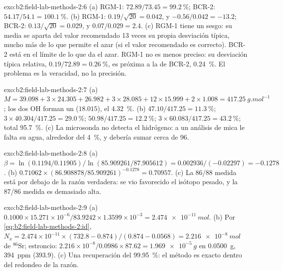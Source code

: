 \begin{solution}{exo:b2:field-lab-methods-2:6}
(a) RGM-1: $72.89/73.45 = \qty{99.2}{\percent}$; BCR-2: $54.17/54.1 = \qty{100.1}{\percent}$.
(b) RGM-1: $0.19/\sqrt{20} = 0.042$, y $-0.56/0.042 = -13.2$; BCR-2: $0.13/\sqrt{20} = 0.029$, y
$0.07/0.029 = 2.4$. (c) RGM-1 tiene un sesgo: su media se aparta del valor recomendado 13 veces su propia
desviación típica, mucho más de lo que permite el azar (si el valor recomendado es correcto). BCR-2 está en
el límite de lo que da el azar. RGM-1 no es menos preciso: su desviación típica relativa,
$0.19/72.89 = \qty{0.26}{\percent}$, es próxima a la de BCR-2, \qty{0.24}{\percent}. El problema es
la veracidad, no la precisión.
\end{solution}

\begin{solution}{exo:b2:field-lab-methods-2:7}
(a) $M = 39.098 + 3 \times 24.305 + 26.982 + 3 \times 28.085 + 12 \times 15.999 + 2 \times 1.008 =
\qty{417.25}{g.mol^{-1}}$; los dos OH forman un  ($18.015$), el \qty{4.32}{\percent}.
(b)  $47.10/417.25 = \qty{11.3}{\percent}$;  $3 \times 40.304/417.25 =
\qty{29.0}{\percent}$;  $50.98/417.25 = \qty{12.2}{\percent}$;  $3 \times
60.083/417.25 = \qty{43.2}{\percent}$; total \qty{95.7}{\percent}. (c) La microsonda no
detecta el hidrógeno: a un análisis de mica le falta su agua, alrededor del \qty{4}{\percent}, y debería sumar cerca de
96.
\end{solution}

\begin{solution}{exo:b2:field-lab-methods-2:8}
(a) $\beta = \ln(0.1194/0.11905)/\ln(85.909261/87.905612) = 0.002936/(-0.02297) = -0.1278$.
(b) $0.71062 \times (86.908878/85.909261)^{-0.1278} = 0.70957$. (c) La 86/88 medida está por debajo de la
razón verdadera: se vio favorecido el isótopo pesado, y la 87/86 medida es demasiado alta.
\end{solution}

\begin{solution}{exo:b2:field-lab-methods-2:9}
(a) $0.1000 \times 15.271 \times 10^{-6}/83.9242 \times 1.3599 \times 10^{-3} = \qty{2.474e-11}{mol}$.
(b) Por \eqref{eq:b2:field-lab-methods-2:id}, $N_x = 2.474 \times 10^{-11} \times (732.8 -
0.874)/(0.874 - 0.0568) = \qty{2.216e-8}{mol}$ de $^{86}\mathrm{Sr}$; estroncio: $2.216 \times
10^{-8}/0.0986 \times 87.62 = \qty{1.969e-5}{g}$ en \qty{0.0500}{g}, \qty{394}{ppm} (393.9).
(c) Una recuperación del \qty{99.95}{\percent}: el método es exacto dentro del redondeo de la razón.
\end{solution}

